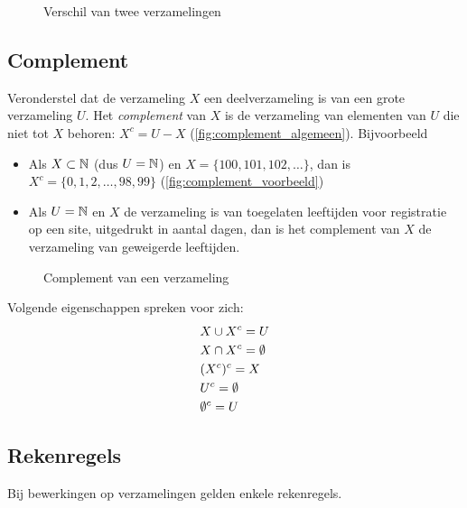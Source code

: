 \begin{figure}[htbp]
\centering
{}\qquad
\subfloat[$\{1,2,3,4\}-\{ 3,4,5,6\}=\{1,2\}$]{
    
    \label{fig:verschil_voorbeeld}
}
\caption{Verschil van twee verzamelingen}
\end{figure}

\subsection{Complement}
Veronderstel dat de verzameling $X$ een deelverzameling is van een grote verzameling $U$. Het \emph{complement}  van $X$ is de verzameling van elementen van $U$ die niet tot $X$ behoren: $X^c=U-X$ (\cref{fig:complement_algemeen}). Bijvoorbeeld
\begin{itemize}
\item Als $X\subset \mathbb{N}$ (dus $U=\nat$) en $X=\{100,101,102,\dots\}$, dan is $X^c=\{0,1,2,\dots,98,99\}$ (\cref{fig:complement_voorbeeld})
\item Als $U=\nat$ en $X$ de verzameling is van toegelaten leeftijden voor registratie op een site, uitgedrukt in aantal dagen, dan is het complement van $X$ de verzameling van geweigerde leeftijden.
\end{itemize}

\begin{figure}
\centering
{}\qquad
\subfloat[$ \{100,101,102,\dots\}^c=\{0,1,2,\dots,98,99\}$ als $U=\nat$]{
    
    \label{fig:complement_voorbeeld}
}
\caption{Complement van een verzameling}
\end{figure}
Volgende eigenschappen spreken voor zich:
\begin{equation*}
\begin{split}
&X\cup X^c=U \\
&X\cap X^c=\emptyset\\
&(X^c)^c=X\\
& U^c=\emptyset \\
&\emptyset^c=U
\end{split}
\end{equation*}

\subsection{Rekenregels}
\label{subsec:verzRekenregels}
Bij bewerkingen op verzamelingen gelden enkele rekenregels.

